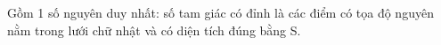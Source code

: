 Gồm 1 số nguyên duy nhất: số tam giác có đỉnh là các điểm có tọa độ nguyên nằm trong lưới chữ   nhật và có diện tích đúng bằng S.